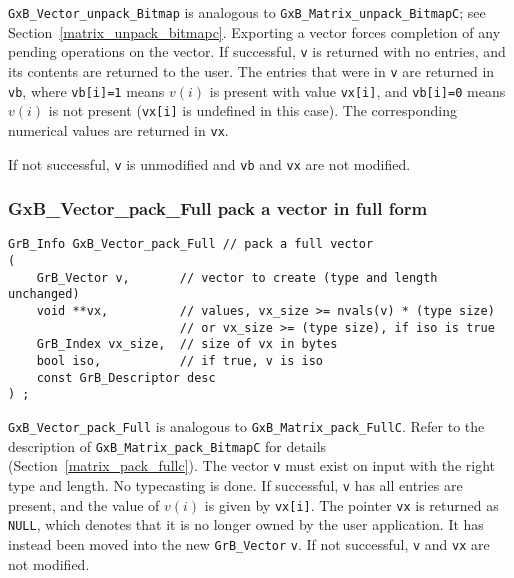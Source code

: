\documentclass[12pt]{article}
\begin{document}
{\verb'GxB_Vector_unpack_Bitmap' is analogous to
\verb'GxB_Matrix_unpack_BitmapC'; see
Section~\ref{matrix_unpack_bitmapc}.
Exporting a vector forces completion of any pending operations on the vector.
If successful, \verb'v' is returned with no entries, and its contents are
returned to the user.
The entries that were in \verb'v' are returned in
\verb'vb', where \verb'vb[i]=1' means $v(i)$ is present with value
\verb'vx[i]', and \verb'vb[i]=0' means $v(i)$ is not present (\verb'vx[i]' is
undefined in this case).  The corresponding numerical values are returned in
\verb'vx'.

If not successful, \verb'v' is unmodified and \verb'vb' and \verb'vx' are not
modified.

\newpage
\subsubsection{{\sf GxB\_Vector\_pack\_Full} pack a vector in full form}
\label{vector_pack_full}

\begin{mdframed}[userdefinedwidth=6in]
{\footnotesize
\begin{verbatim}
GrB_Info GxB_Vector_pack_Full // pack a full vector
(
    GrB_Vector v,       // vector to create (type and length unchanged)
    void **vx,          // values, vx_size >= nvals(v) * (type size)
                        // or vx_size >= (type size), if iso is true
    GrB_Index vx_size,  // size of vx in bytes
    bool iso,           // if true, v is iso
    const GrB_Descriptor desc
) ;
\end{verbatim}
} \end{mdframed}

\noindent
\verb'GxB_Vector_pack_Full' is analogous to \verb'GxB_Matrix_pack_FullC'.
Refer to the description of \verb'GxB_Matrix_pack_BitmapC' for details
(Section~\ref{matrix_pack_fullc}).
The vector \verb'v' must exist on input with the right type and length.
No typecasting is done.
If successful, \verb'v' has
all entries are present, and the value of $v(i)$ is given by \verb'vx[i]'.
The pointer \verb'vx' is returned as \verb'NULL', which denotes that it is no
longer owned by the user application.  It has instead been moved into the new
\verb'GrB_Vector' \verb'v'.
If not successful, \verb'v' and
\verb'vx' are not modified.

}
\end{document}
